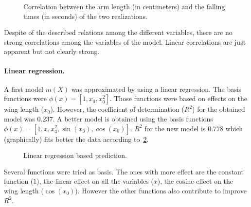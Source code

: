 \begin{figure}
  \centering
  
  \caption{Correlation between the arm length (in centimeters) and the falling
  times (in seconds) of the two realizations.}
  \label{fig_al_times}
\end{figure}

Despite of the described relations among the different variables, there are no
strong correlations among the variables of the model. Linear correlations are
just apparent but not clearly strong.

\paragraph{Linear regression.} A first model $m(X)$ was approximated by using a
linear regression. The basis functions were $\phi(x) = [1, x_0, x_0^2]$. Those
functions were based on effects on the wing length ($x_0$). However, the
coefficient of determination ($R^2$) for the obtained model was $0.237$. A
better model is obtained using the basis functions $\phi(x) = [1, x, x_3^2,
\sin(x_3), \cos(x_0)]$. $R^2$  for the new model is $0.778$ which (graphically)
fits better the data according to~\cref{fig_goodlr}.
\begin{figure}
  \centering
  
  \caption{Linear regression based prediction.}
  \label{fig_goodlr}
\end{figure}

\begin{comment}
  \begin{figure}
    \centering
    
    \caption{Comparison between the times measured in the two realizations.}
    \label{fig_badlr}
  \end{figure}
\end{comment}
Several functions were tried as basis. The ones with more effect are the
constant function ($1$), the linear effect on all the variables ($x$), the
cosine effect on the wing length ($\cos(x_0)$). However the other functions also
contribute to improve $R^2$.

